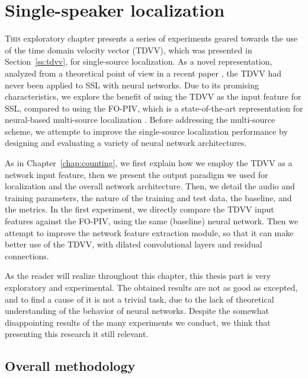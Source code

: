 \chapter{Single-speaker localization}
\label{chap:tdvv}

\lettrine{T}{his} exploratory chapter presents a series of experiments geared towards the use of the time domain velocity vector (TDVV), which was presented in Section~\ref{ss:tdvv}, for single-source localization. As a novel representation, analyzed from a theoretical point of view in a recent paper \cite{daniel_time_2020}, the TDVV had never been applied to SSL with neural networks. Due to its promising characteristics, we explore the benefit of using the TDVV as the input feature for SSL, compared to using the FO-PIV, which is a state-of-the-art representation for neural-based multi-source localization \cite{perotin_crnn-based_2018}. Before addressing the multi-source scheme, we attempte to improve the single-source localization performance by designing and evaluating a variety of neural network architectures. 

As in Chapter~\ref{chap:counting}, we first explain how we employ the TDVV as a network input feature, then we present the output paradigm we used for localization and the overall network architecture. Then, we detail the audio and training parameters, the nature of the training and test data, the baseline, and the metrics. In the first experiment, we directly compare the TDVV input features against the FO-PIV, using the same (baseline) neural network. Then we attempt to improve the network feature extraction module, so that it can make better use of the TDVV, with dilated convolutional layers and residual connections. 

As the reader will realize throughout this chapter, this thesis part is very exploratory and experimental. The obtained results are not as good as excepted, and to find a cause of it is not a trivial task, due to the lack of theoretical understanding of the behavior of neural networks. Despite the somewhat disappointing results of the many experiments we conduct, we think that presenting this research it still relevant.

\section{Overall methodology}

